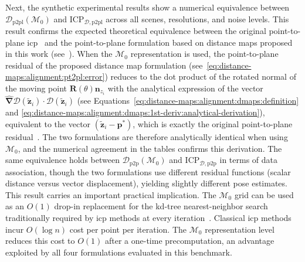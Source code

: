 Next, the synthetic experimental results show a numerical equivalence between
$\mathcal{D}_\mathrm{p2pl}(\mathcal{M}_0)$ and
$\mathrm{ICP}_{\mathcal{D},\mathrm{p2pl}}$ across all scenes, resolutions, and
noise levels. This result confirms the expected theoretical equivalence
between the original point-to-plane \gls{icp}~\cite{chen-medioni:icra:1991} and
the point-to-plane formulation based on distance maps proposed in this work
(see~).
When the $\mathcal{M}_0$ representation is used,
the point-to-plane residual of the proposed distance map formulation
(see~\eqref{eq:distance-maps:alignment:pt2pl:error}) reduces to the dot product
of the rotated normal of the moving point $\mathbf{R}(\theta)\mathbf{n}_{z_i}$
with the analytical expression of the vector
$\hat{\bm{\nabla}}\mathcal{D}\!\left(\tilde{\mathbf{z}}_i\right) \cdot
\mathcal{D}\!\left(\tilde{\mathbf{z}}_i\right)$
(see Equations~\ref{eq:distance-maps:alignment:dmaps:definition} and
\ref{eq:distance-maps:alignment:dmaps:1st-deriv:analytical-derivation}),
equivalent to the vector $(\tilde{\mathbf{z}}_i - \mathbf{p}^*)$, which is
exactly the original point-to-plane residual~\cite{chen-medioni:icra:1991}.
The two formulations are therefore analytically identical when using
$\mathcal{M}_0$, and the numerical agreement in the tables confirms this
derivation. The same equivalence holds between
$\mathcal{D}_\mathrm{p2p}(\mathcal{M}_0)$ and
$\mathrm{ICP}_{\mathcal{D},\mathrm{p2p}}$ in terms of data association, though
the two formulations use different residual functions (scalar distance versus
vector displacement), yielding slightly different pose estimates.
This result carries an important practical implication. The $\mathcal{M}_0$
grid can be used as an $O(1)$ drop-in replacement for the kd-tree nearest-neighbor
search~\cite{bentley:cacm:1975} traditionally required by \gls{icp} methods at
every iteration~\cite{besl-mckay:tpami:1992,chen-medioni:icra:1991,segal:rss:2009}.
Classical \gls{icp} methods incur $O(\log n)$ cost per point per iteration.
The $\mathcal{M}_0$ representation level reduces this cost to $O(1)$ after a
one-time precomputation, an advantage exploited by all four formulations
evaluated in this benchmark.

